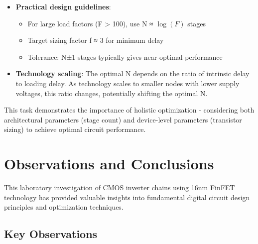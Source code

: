 \documentclass[UTF8,12pt,a4paper]{ctexart}
\begin{document}
\begin{itemize}
    \item \textbf{Practical design guidelines}:
    \begin{itemize}
        \item For large load factors (F > 100), use N ≈ $\log(F)$ stages
        \item Target sizing factor f ≈ 3 for minimum delay
        \item Tolerance: N±1 stages typically gives near-optimal performance
    \end{itemize}
    
    \item \textbf{Technology scaling}: The optimal N depends on the ratio of intrinsic delay to loading delay. As technology scales to smaller nodes with lower supply voltages, this ratio changes, potentially shifting the optimal N.
\end{itemize}

This task demonstrates the importance of holistic optimization - considering both architectural parameters (stage count) and device-level parameters (transistor sizing) to achieve optimal circuit performance.

\section{Observations and Conclusions}

This laboratory investigation of CMOS inverter chains using 16nm FinFET technology has provided valuable insights into fundamental digital circuit design principles and optimization techniques.

\subsection{Key Observations}
\end{document}
